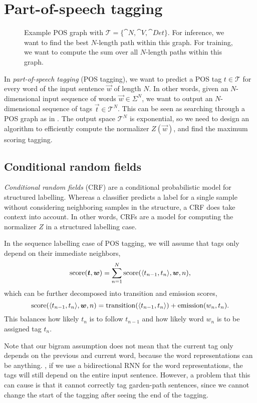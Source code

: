 \section{Part-of-speech tagging} \label{sec:pos-tagging}

\begin{figure}[ht]
    \centering
    \caption{Example POS graph with $\mathcal{T} = \{ \cat{N}, \cat{V},
    \cat{Det} \}$. For inference, we want to find the best $N$-length path
    within this graph. For training, we want to compute the sum over all
    $N$-length paths within this graph.}
    \label{fig:pos-graph}
\end{figure}

In \textit{part-of-speech tagging} (POS tagging), we want to predict a POS tag
$t\in\mathcal{T}$ for every word of the input sentence $\vec{w}$ of length $N$.
In other words, given an $N$-dimensional input sequence of words $\vec{w} \in
\Sigma^N$, we want to output an $N$-dimensional sequence of tags $\vec{t} \in
\mathcal{T}^N$. This can be seen as searching through a POS graph as in
. The output space $\mathcal{T}^N$ is exponential, so we
need to design an algorithm to efficiently compute the normalizer $Z(\vec{w})$,
and find the maximum scoring tagging.

\subsection{Conditional random fields}

\textit{Conditional random fields} (CRF) are a conditional probabilistic model
for structured labelling. Whereas a classifier predicts a label for a single
sample without considering neighboring samples in the structure, a CRF does
take context into account. In other words, CRFs are a model for computing the
normalizer $Z$ in a structured labelling case.

In the sequence labelling case of POS tagging, we will assume that tags only
depend on their immediate neighbors, \[
  \mathrm{score}(\bm{t},\bm{w}) = \sum_{n=1}^N \mathrm{score}(\langle t_{n-1},t_n \rangle, \bm{w}, n)
,\]
which can be further decomposed into transition and emission scores, \[
  \mathrm{score}(\langle t_{n-1},t_n \rangle, \bm{w}, n) = \mathrm{transition}(\langle t_{n-1},t_n \rangle) + \mathrm{emission}(w_n, t_n)
.\]
This balances how likely $t_n$ is to follow $t_{n-1}$ and how likely word $w_n$
is to be assigned tag $t_n$.

Note that our bigram assumption does not mean that the current tag only depends
on the previous and current word, because the word representations can be
anything. \Eg, if we use a bidirectional RNN for the word representations, the
tags will still depend on the entire input sentence. However, a problem that
this can cause is that it cannot correctly tag garden-path sentences, since we
cannot change the start of the tagging after seeing the end of the
tagging.

